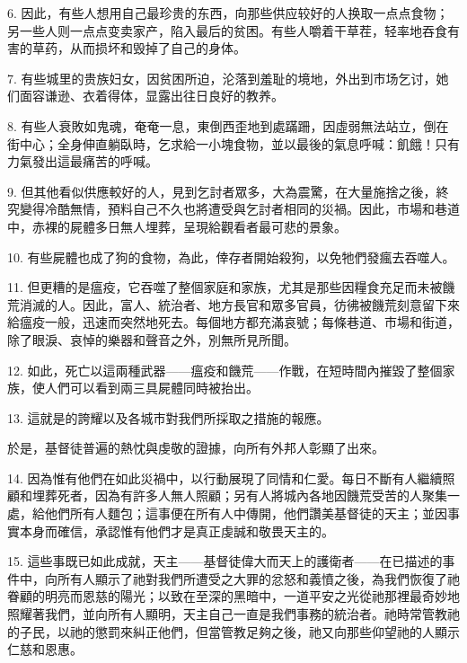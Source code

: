 6. 因此，有些人想用自己最珍贵的东西，向那些供应较好的人换取一点点食物；另一些人则一点点变卖家产，陷入最后的贫困。有些人嚼着干草茬，轻率地吞食有害的草药，从而损坏和毁掉了自己的身体。\par

7. 有些城里的贵族妇女，因贫困所迫，沦落到羞耻的境地，外出到市场乞讨，她们面容谦逊、衣着得体，显露出往日良好的教养。\par

8. 有些人衰敗如鬼魂，奄奄一息，東倒西歪地到處蹣跚，因虛弱無法站立，倒在街中心；全身伸直躺臥時，乞求給一小塊食物，並以最後的氣息呼喊：飢餓！只有力氣發出這最痛苦的呼喊。\par

9. 但其他看似供應較好的人，見到乞討者眾多，大為震驚，在大量施捨之後，終究變得冷酷無情，預料自己不久也將遭受與乞討者相同的災禍。因此，市場和巷道中，赤裸的屍體多日無人埋葬，呈現給觀看者最可悲的景象。\par

10. 有些屍體也成了狗的食物，為此，倖存者開始殺狗，以免牠們發瘋去吞噬人。\par

11. 但更糟的是瘟疫，它吞噬了整個家庭和家族，尤其是那些因糧食充足而未被饑荒消滅的人。因此，富人、統治者、地方長官和眾多官員，彷彿被饑荒刻意留下來給瘟疫一般，迅速而突然地死去。每個地方都充滿哀號；每條巷道、市場和街道，除了眼淚、哀悼的樂器和聲音之外，別無所見所聞。\par

12. 如此，死亡以這兩種武器——瘟疫和饑荒——作戰，在短時間內摧毀了整個家族，使人們可以看到兩三具屍體同時被抬出。\par

13. 這就是的誇耀以及各城市對我們所採取之措施的報應。\par

於是，基督徒普遍的熱忱與虔敬的證據，向所有外邦人彰顯了出來。\par

14. 因為惟有他們在如此災禍中，以行動展現了同情和仁愛。每日不斷有人繼續照顧和埋葬死者，因為有許多人無人照顧；另有人將城內各地因饑荒受苦的人聚集一處，給他們所有人麵包；這事便在所有人中傳開，他們讚美基督徒的天主；並因事實本身而確信，承認惟有他們才是真正虔誠和敬畏天主的。\par

15. 這些事既已如此成就，天主——基督徒偉大而天上的護衛者——在已描述的事件中，向所有人顯示了祂對我們所遭受之大罪的忿怒和義憤之後，為我們恢復了祂眷顧的明亮而恩慈的陽光；以致在至深的黑暗中，一道平安之光從祂那裡最奇妙地照耀著我們，並向所有人顯明，天主自己一直是我們事務的統治者。祂時常管教祂的子民，以祂的懲罰來糾正他們，但當管教足夠之後，祂又向那些仰望祂的人顯示仁慈和恩惠。\par

